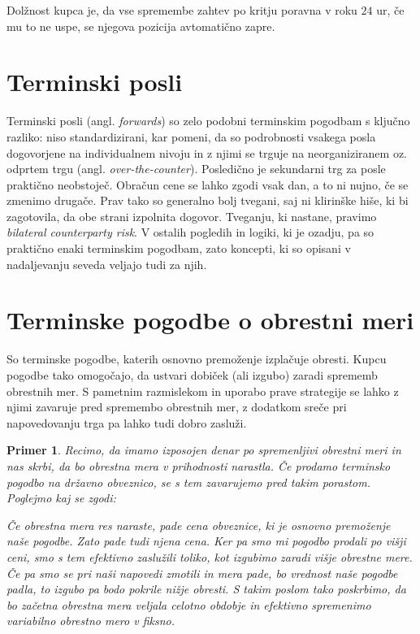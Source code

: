\documentclass[a4paper, 11pt]{article}
\newtheorem{primer}{Primer}
\begin{document}
Dolžnost kupca je, da vse spremembe zahtev po kritju poravna v roku $24$ ur, če mu to ne uspe, se
njegova pozicija avtomatično zapre.

\section{Terminski posli}
Terminski posli (angl. \textit{forwards}) so zelo podobni terminskim pogodbam s ključno razliko:
niso standardizirani, kar pomeni, da so podrobnosti vsakega posla dogovorjene na individualnem nivoju 
in z njimi se trguje na neorganiziranem oz. odprtem trgu (angl. \textit{over-the-counter}). Posledično 
je sekundarni trg za posle praktično neobstoječ. Obračun cene se lahko zgodi vsak dan, a to ni nujno, 
če se zmenimo drugače. Prav tako so generalno bolj tvegani, saj ni klirinške hiše, ki bi zagotovila, 
da obe strani izpolnita dogovor. Tveganju, ki nastane, pravimo \textit{bilateral counterparty risk}. 
V ostalih pogledih in logiki, ki je ozadju, pa so praktično enaki terminskim pogodbam, zato koncepti, 
ki so opisani v nadaljevanju seveda veljajo tudi za njih.

\section{Terminske pogodbe o obrestni meri}
So terminske pogodbe, katerih osnovno premoženje izplačuje obresti. Kupcu pogodbe tako omogočajo, da 
ustvari dobiček (ali izgubo) zaradi sprememb obrestnih mer. S pametnim razmislekom in uporabo prave 
strategije se lahko z njimi zavaruje pred spremembo obrestnih mer, z dodatkom sreče pri napovedovanju
trga pa lahko tudi dobro zasluži.

\begin{primer}
    Recimo, da imamo izposojen denar po spremenljivi obrestni meri in nas skrbi, da bo obrestna mera v 
    prihodnosti narastla. Če prodamo terminsko pogodbo na državno obveznico, se s tem zavarujemo pred 
    takim porastom. Poglejmo kaj se zgodi:

    Če obrestna mera res naraste, pade cena obveznice, ki je osnovno premoženje naše pogodbe. Zato pade
    tudi njena cena. Ker pa smo mi pogodbo prodali po višji ceni, smo s tem efektivno zaslužili toliko, 
    kot izgubimo zaradi višje obrestne mere. Če pa smo se pri naši napovedi zmotili in mera pade, bo 
    vrednost naše pogodbe padla, to izgubo pa bodo pokrile nižje obresti. S takim poslom tako poskrbimo, 
    da bo začetna obrestna mera veljala celotno obdobje in efektivno spremenimo variabilno obrestno mero 
    v fiksno. 
\end{primer}
\end{document}
